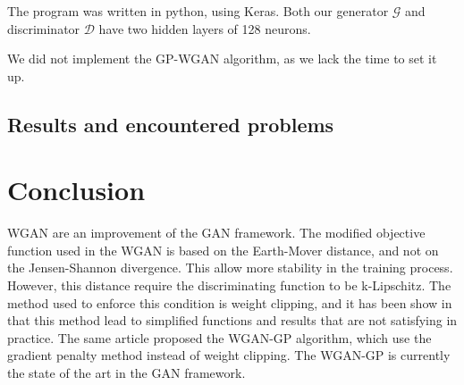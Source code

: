 \documentclass[a4paper]{report}
\newcommand{\G}{\mathcal{G}}
\newcommand{\D}{\mathcal{D}}
\theoremstyle{plain}
\theoremstyle{remark}
\theoremstyle{definition}
\begin{document}
The program was written in python, using Keras. Both our generator $\G$ and discriminator $\D$ have two hidden layers of 128 neurons.

We did not implement the GP-WGAN algorithm, as we lack the time to set it up.

\section{Results and encountered problems}



\chapter*{Conclusion}

WGAN are an improvement of the GAN framework. The modified objective function used in the WGAN is based on the Earth-Mover distance, and not on the Jensen-Shannon divergence. This allow more stability in the training process. However, this distance require the discriminating function to be k-Lipschitz. The method used to enforce this condition is weight clipping, and it has been show in \cite{gulrajani2017improved} that this method lead to simplified functions and results that are not satisfying in practice. The same article proposed the WGAN-GP algorithm, which use the gradient penalty method instead of weight clipping. The WGAN-GP is currently the state of the art in the GAN framework.

\nocite{*}


\end{document}

